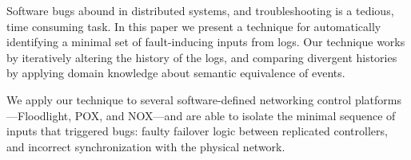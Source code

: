 Software bugs abound in distributed systems, and troubleshooting
is a tedious, time consuming task.
In this paper we present a technique for automatically identifying
a minimal set of fault-inducing inputs from logs. Our technique works by
iteratively altering the history of the logs, and comparing divergent histories
by applying domain knowledge about semantic equivalence of events.

We apply our technique to several software-defined networking control
platforms---Floodlight, POX, and NOX---and
are able to isolate the minimal sequence of inputs that triggered
 bugs: faulty failover logic between replicated controllers, and incorrect
synchronization with the physical network.
